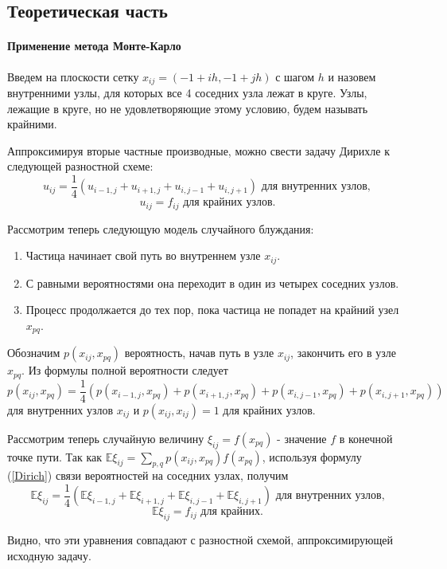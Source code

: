 \documentclass[16pt]{article}
\begin{document}
\subsection{Теоретическая часть}
\paragraph{Применение метода Монте-Карло}
Введем на плоскости сетку $x_{ij} = (-1 + ih, -1 + jh)$ с шагом $h$ и назовем внутренними узлы, для которых все 4 соседних узла лежат в круге. Узлы, лежащие в круге, но не удовлетворяющие этому условию, будем называть крайними. 

Аппроксимируя вторые частные производные, можно свести задачу Дирихле к следующей разностной схеме:
$$u_{ij} = \dfrac14(u_{i-1,j} + u_{i+1, j} + u_{i, j-1} + u_{i,j+1}) \text{ для внутренних узлов},$$
$$u_{ij} = f_{ij} \text{ для крайних узлов}.$$

Рассмотрим теперь следующую модель случайного блуждания: 
\begin{enumerate}
	\item Частица начинает свой путь во внутреннем узле $x_{ij}$.
	\item С равными вероятностями она переходит в один из четырех соседних узлов.
	\item Процесс продолжается до тех пор, пока частица не попадет на крайний узел $x_{pq}$.
\end{enumerate}


Обозначим $p(x_{ij}, x_{pq})$ вероятность, начав путь в узле $x_{ij}$, закончить его в узле $x_{pq}$. Из формулы полной вероятности следует
\begin{equation}\label{Dirich}
p(x_{ij}, x_{pq}) = \dfrac14(p(x_{i-1,j}, x_{pq}) + p(x_{i+1, j}, x_{pq}) + p(x_{i, j-1}, x_{pq}) + p(x_{i,j+1}, x_{pq}))
\end{equation}
для внутренних узлов $x_{ij}$ и $p(x_{ij}, x_{ij}) = 1$ для крайних узлов.

Рассмотрим теперь случайную величину $\xi_{ij} = f(x_{pq})$ - значение $f$ в конечной точке пути.
Так как $\mathbb{E}\xi_{ij} = \sum_{p, q}p(x_{ij}, x_{pq})f(x_{pq})$, используя формулу (\ref{Dirich}) связи вероятностей на соседних узлах, получим
$$\mathbb{E}\xi_{ij} = \dfrac14(\mathbb{E}\xi_{i-1,j} + \mathbb{E}\xi_{i+1, j} + \mathbb{E}\xi_{i, j-1} + \mathbb{E}\xi_{i,j+1}) \text{ для внутренних узлов,}$$
$$\mathbb{E}\xi_{ij} = f_{ij} \text{ для крайних}.$$

Видно, что эти уравнения совпадают с разностной схемой, аппроксимирующей исходную задачу.
\end{document}
